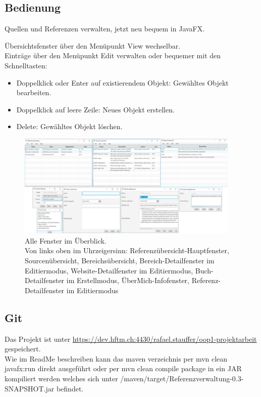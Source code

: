 \subsection{Bedienung}
{\large Quellen und Referenzen verwalten, jetzt neu bequem in JavaFX.\\}

Übersichtsfenster über den Menüpunkt View wechselbar.\\
Einträge über den Menüpunkt Edit verwalten oder bequemer mit den Schnelltasten:
\begin{itemize}
	\item Doppelklick oder Enter auf existierendem Objekt: Gewähltes Objekt bearbeiten.
	\item Doppelklick auf leere Zeile: Neues Objekt erstellen.
	\item Delete: Gewähltes Objekt löschen.
\end{itemize}

\begin{figure}[H]
	\centering
	\includegraphics[width=0.95\textwidth]{screenshots}
	\caption{Alle Fenster im Überblick.\\{\footnotesize Von links oben im Uhrzeigersinn: Referenzübersicht-Hauptfenster, Sourcenübersicht, Bereichsübersicht, Bereich-Detailfenster im Editiermodus, Website-Detailfenster im Editiermodus, Buch-Detailfenster im Erstellmodus, ÜberMich-Infofenster, Referenz-Detailfenster im Editiermodus}}
\end{figure}

\subsection{Git}

Das Projekt ist unter \url{https://dev.hftm.ch:4430/rafael.stauffer/oop1-projektarbeit} gespeichert.\\
Wie im ReadMe beschreiben kann das maven verzeichnis per {\ttfamily mvn clean javafx:run} direkt ausgeführt oder per {\ttfamily mvn clean compile package} in ein JAR kompiliert werden welches sich unter {\ttfamily /maven/target/Referenzverwaltung-0.3-SNAPSHOT.jar} befindet.

